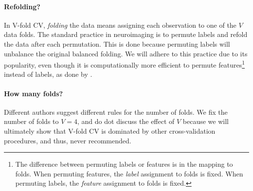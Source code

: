 \documentclass[12pt,a4paper]{article}
\begin{document}
\paragraph{Refolding?}
In V-fold CV, \emph{folding} the data means assigning each observation to one of the $V$ data folds. 
The standard practice in neuroimaging is to permute labels and refold the data after each permutation. 
This is done because permuting labels will unbalance the original balanced folding.
We will adhere to this practice due to its popularity, even though it is computationally more efficient to permute features\footnote{The difference between permuting labels or features is in the mapping to folds. When permuting features, the \textit{label} assignment to folds is fixed. When permuting labels, the \textit{feature} assignment to folds is fixed.} instead of labels, as done by \citet{golland_permutation_2005}.


\paragraph{How many folds?}
Different authors suggest different rules for the number of folds. 
We fix the number of folds to $V=4$, and do dot discuss the effect of $V$ because we will ultimately show that V-fold CV is dominated by other cross-validation procedures, and thus, never recommended. 

\bigskip
\end{document}
